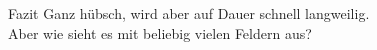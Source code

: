 \begin{frame}{Fazit}
    Ganz hübsch, wird aber auf Dauer schnell langweilig.\\
    Aber wie sieht es mit beliebig vielen Feldern aus?
\end{frame}